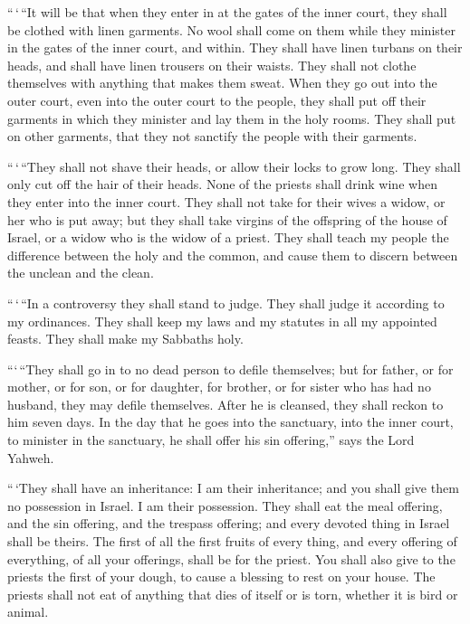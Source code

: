  ``\,`\,``It will be that when they enter in at the gates
of the inner court, they shall be clothed with linen garments. No wool
shall come on them while they minister in the gates of the inner court,
and within.  They shall have linen turbans on their heads,
and shall have linen trousers on their waists. They shall not clothe
themselves with anything that makes them sweat.  When they
go out into the outer court, even into the outer court to the people,
they shall put off their garments in which they minister and lay them in
the holy rooms. They shall put on other garments, that they not sanctify
the people with their garments.

 ``\,`\,``They shall not shave their heads, or allow their
locks to grow long. They shall only cut off the hair of their heads.
 None of the priests shall drink wine when they enter into
the inner court.  They shall not take for their wives a
widow, or her who is put away; but they shall take virgins of the
offspring of the house of Israel, or a widow who is the widow of a
priest.  They shall teach my people the difference between
the holy and the common, and cause them to discern between the unclean
and the clean.

 ``\,`\,``In a controversy they shall stand to judge. They
shall judge it according to my ordinances. They shall keep my laws and
my statutes in all my appointed feasts. They shall make my Sabbaths
holy.

 ```\,``They shall go in to no dead person to defile
themselves; but for father, or for mother, or for son, or for daughter,
for brother, or for sister who has had no husband, they may defile
themselves.  After he is cleansed, they shall reckon to him
seven days.  In the day that he goes into the sanctuary,
into the inner court, to minister in the sanctuary, he shall offer his
sin offering,'' says the Lord Yahweh.

 ``\,`They shall have an inheritance: I am their
inheritance; and you shall give them no possession in Israel. I am their
possession.  They shall eat the meal offering, and the sin
offering, and the trespass offering; and every devoted thing in Israel
shall be theirs.  The first of all the first fruits of
every thing, and every offering of everything, of all your offerings,
shall be for the priest. You shall also give to the priests the first of
your dough, to cause a blessing to rest on your house.  The
priests shall not eat of anything that dies of itself or is torn,
whether it is bird or animal.


